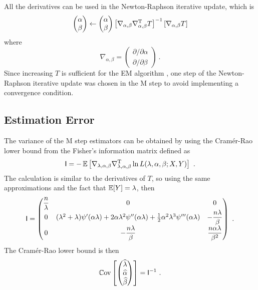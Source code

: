 All the derivatives can be used in the Newton-Raphson iterative update, which is
\begin{equation}
	\begin{pmatrix}
		\alpha \\ \beta
	\end{pmatrix}
	\leftarrow
	\begin{pmatrix}
		\alpha \\ \beta
	\end{pmatrix}
	\left[
		\nabla_{\alpha,\beta}\nabla_{\alpha,\beta}^\textup{T} T
	\right]^{-1}
	\left[
		\nabla_{\alpha,\beta} T
	\right]
\end{equation}
where
\begin{equation}
	\nabla_{\alpha,\beta}=
	\begin{pmatrix}
		{\partial}/{\partial \alpha}
		\\
		{\partial}/{\partial \beta}
	\end{pmatrix}
	\ .
\end{equation}
Since increasing $T$ is sufficient for the EM algorithm \citep{dempster1977maximum}, one step of the Newton-Raphson iterative update was chosen in the M step to avoid implementing a convergence condition.

\subsection{Estimation Error}

The variance of the M step estimators can be obtained by using the Cram\'er-Rao lower bound \citep{rao1945information} \citep{cramer1946mathematical} from the Fisher's information matrix defined as
\begin{equation}
	\mathsf{I} = -\operatorname{\mathbb{E}}\left[
		\nabla_{\lambda,\alpha,\beta}\nabla_{\lambda,\alpha,\beta}^\textup{T} \ln L(\lambda,\alpha,\beta;X,Y)
	\right]
	\ .
\end{equation}
The calculation is similar to the derivatives of $T$, so using the same approximations and the fact that $\operatorname{\mathbb{E}}[Y]=\lambda$, then
\begin{equation}
	\mathsf{I}=
	\begin{pmatrix}
		\dfrac{n}{\lambda} & 0 & 0 \\
		0 & (\lambda^2+\lambda)\psi'(\alpha\lambda)+2\alpha\lambda^2\psi''(\alpha\lambda)+\frac{1}{2}\alpha^2\lambda^3\psi'''(\alpha\lambda) & -\dfrac{n\lambda}{\beta}\\
		0 & -\dfrac{n\lambda}{\beta} & \dfrac{n\alpha\lambda}{\beta^2}
	\end{pmatrix}
	\ .
\end{equation}
The Cram\'er-Rao lower bound is then
\begin{equation}
	\operatorname{\mathbb{C}ov}\left[
		\begin{pmatrix}
			\widehat{\lambda}\\\widehat{\alpha}\\\widehat{\beta}
		\end{pmatrix}
	\right]
	=
	\mathsf{I}^{-1}
	\ .
\end{equation}

